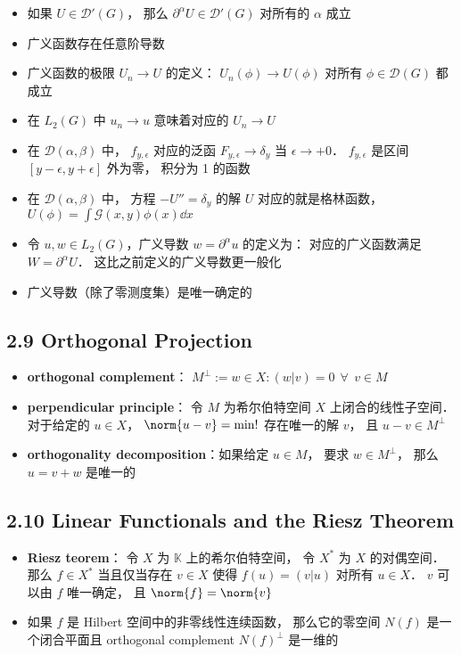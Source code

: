 \begin{itemize}
\item 如果 $U \in\mathcal D'(G)$， 那么 $\partial^\alpha U \in\mathcal D'(G)$ 对所有的 $\alpha$ 成立

\item 广义函数存在任意阶导数

\item 广义函数的极限 $U_n \to U$ 的定义： $U_n(\phi)\to U(\phi)$ 对所有 $\phi \in\mathcal D(G)$ 都成立

\item 在 $L_2(G)$ 中 $u_n\to u$ 意味着对应的 $U_n \to U$

\item 在 $\mathcal D(\alpha,\beta)$ 中， $f_{y,\epsilon}$ 对应的泛函 $F_{y, \epsilon}\to \delta_y$ 当 $\epsilon \to +0$． $f_{y,\epsilon}$ 是区间 $[y-\epsilon,y+\epsilon]$ 外为零， 积分为 1 的函数

\item 在 $\mathcal D(\alpha,\beta)$ 中， 方程 $-U'' = \delta_y$ 的解 $U$ 对应的就是格林函数， $U(\phi) = \int \mathcal G(x, y) \phi(x) \dd{x}$

\item 令 $u, w \in L_2(G)$，广义导数 $w = \partial^\alpha u$ 的定义为： 对应的广义函数满足 $W = \partial^\alpha U$． 这比之前定义的广义导数更一般化

\item 广义导数（除了零测度集）是唯一确定的
\end{itemize}

\subsection{2.9 Orthogonal Projection}
\begin{itemize}
\item \textbf{orthogonal complement}： $M^\bot := {w \in X: (w|v) = 0\ \ \forall\ \ v\in M}$

\item \textbf{perpendicular principle}： 令 $M$ 为希尔伯特空间 $X$ 上闭合的线性子空间． 对于给定的 $u\in X$， $\norm{u - v} = \min!$ 存在唯一的解 $v$， 且 $u - v\in M^\bot$

\item \textbf{orthogonality decomposition}：如果给定 $u \in M$， 要求 $w \in M^\bot$， 那么 $u = v + w$ 是唯一的
\end{itemize}

\subsection{2.10 Linear Functionals and the Riesz Theorem}
\begin{itemize}
\item \textbf{Riesz teorem}： 令 $X$ 为 $\mathbb K$ 上的希尔伯特空间， 令 $X^*$ 为 $X$ 的对偶空间． 那么 $f\in X^*$ 当且仅当存在 $v\in X$ 使得 $f(u) = (v|u)$ 对所有 $u\in X$． $v$ 可以由 $f$ 唯一确定， 且 $\norm{f} = \norm{v}$

\item 如果 $f$ 是 Hilbert 空间中的非零线性连续函数， 那么它的零空间 $N(f)$ 是一个闭合平面且 orthogonal complement $N(f)^\bot$ 是一维的
\end{itemize}

